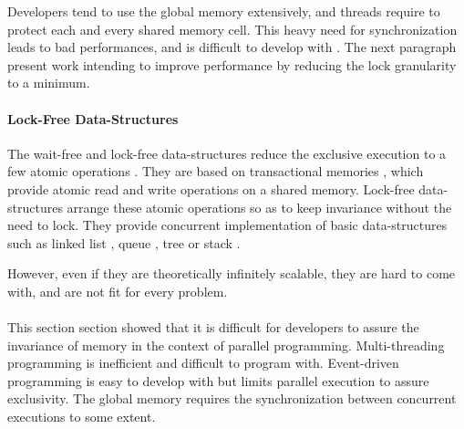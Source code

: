 
Developers tend to use the global memory extensively, and threads require to protect each and every shared memory cell.
This heavy need for synchronization leads to bad performances, and is difficult to develop with \cite{Adya2002}.
The next paragraph present work intending to improve performance by reducing the lock granularity to a minimum.


\paragraph{Lock-Free Data-Structures}

The wait-free and lock-free data-structures reduce the exclusive execution to a few atomic operations \cite{Lamport1977,Herlihy1988,Herlihy1990,Herlihy1991,Anderson1990}.
They are based on transactional memories \cite{Harris2010}, which provide atomic read and write operations on a shared memory.
Lock-free data-structures arrange these atomic operations so as to keep invariance without the need to lock.
They provide concurrent implementation of basic data-structures such as linked list \cite{Valois1995,Timnat2012}, queue \cite{Sundell2003,Wimmer2015}, tree \cite{Ramachandran2015} or stack \cite{Hendler2004}.

However, even if they are theoretically infinitely scalable, they are hard to come with, and are not fit for every problem.




\paragraph{}

This section section showed that it is difficult for developers to assure the invariance of memory in the context of parallel programming.
Multi-threading programming is inefficient and difficult to program with.
Event-driven programming is easy to develop with but limits parallel execution to assure exclusivity.
The global memory requires the synchronization between concurrent executions to some extent.

